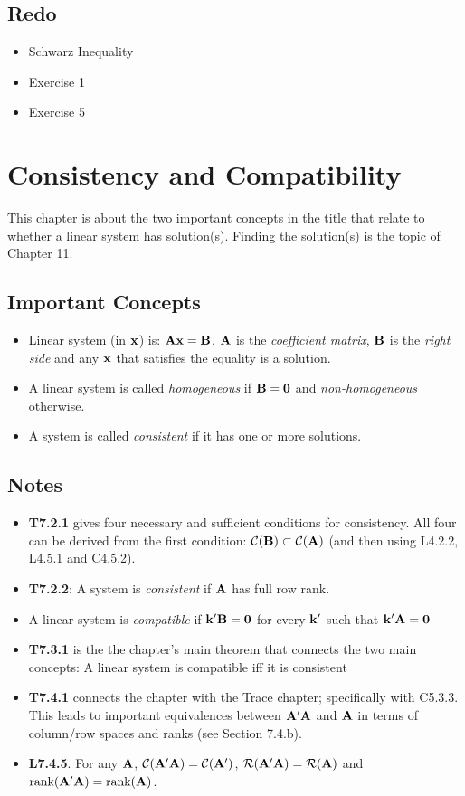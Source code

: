\documentclass[a4paper, oneside]{book}
\begin{document}
\section*{Redo}
\begin{itemize}
\item Schwarz Inequality
\item Exercise 1
\item Exercise 5
\end{itemize}

\chapter{Consistency and Compatibility}
This chapter is about the two important concepts in the title that relate to whether a linear system has solution(s). Finding the solution(s) is the topic of Chapter 11.

\section*{Important Concepts}
\begin{itemize}
\item Linear system (in $\mathbf{x}$) is: $\mathbf{Ax=B}$. $\mathbf A$ is the \textit{coefficient matrix}, $\mathbf B$ is the \textit{right side} and any $\mathbf x$ that satisfies the equality is a solution. 
\item A linear system is called \textit{homogeneous} if $\mathbf{B=0}$ and \textit{non-homogeneous} otherwise.
\item A system is called \textit{consistent} if it has one or more solutions.
\end{itemize}

\section*{Notes}
\begin{itemize}
\item \textbf{T7.2.1} gives four necessary and sufficient conditions for consistency. All four can be derived from the first condition: $\mathcal{C}(\mathbf{B}) \subset \mathcal{C}(\mathbf{A})$ (and then using L4.2.2, L4.5.1 and C4.5.2).
\item \textbf{T7.2.2}: A system is \textit{consistent} if $\mathbf{A}$ has full row rank.
\item A linear system is \textit{compatible} if $\mathbf{k'B=0}$ for every $\mathbf k'$ such that $\mathbf{k'A=0}$
\item \textbf{T7.3.1} is the the chapter's main theorem that connects the two main concepts: A linear system is compatible iff it is consistent
\item \textbf{T7.4.1} connects the chapter with the Trace chapter; specifically with C5.3.3. This leads to important equivalences between $\mathbf{A'A}$ and $\mathbf A$ in terms of column/row spaces and ranks (see Section 7.4.b).
\item \textbf{L7.4.5}. For any $\mathbf{A}$, $\mathcal{C}(\mathbf{A'A})=\mathcal{C}(\mathbf{A}')$, $\mathcal{R}(\mathbf{A'A})=\mathcal{R}(\mathbf{A})$ and $\text{rank}(\mathbf{A'A})=\text{rank}(\mathbf{A})$.
\end{itemize}
\end{document}
